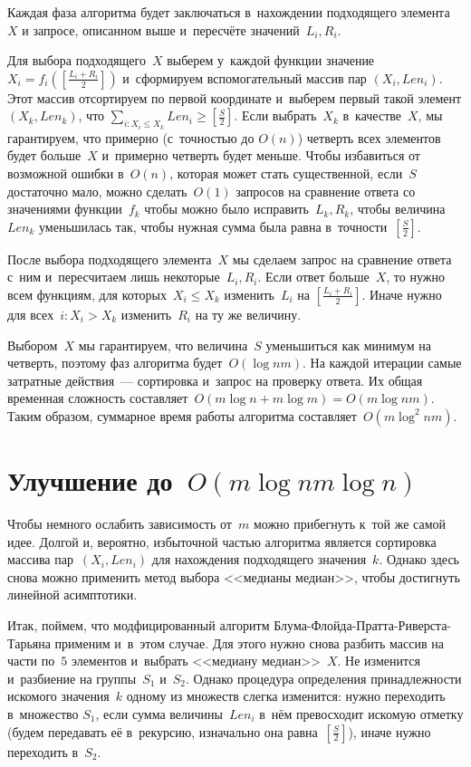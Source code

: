 \documentclass{article}
\renewcommand{\le}{\leqslant}
\renewcommand{\ge}{\geqslant}
\begin{document}
Каждая фаза алгоритма будет заключаться в~нахождении подходящего элемента $X$ и
запросе, описанном выше и~пересчёте значений~$L_i, R_i$.

Для выбора подходящего~$X$ выберем у~каждой функции значение~$X_i =
f_i(\left[\frac{L_i + R_i}{2}\right])$ и~сформируем вспомогательный массив пар
$(X_i, Len_i)$. Этот массив отсортируем по первой координате и~выберем первый
такой элемент $(X_k, Len_k)$, что $\sum\limits_{i: X_i \le X_k} Len_i \ge
\left[\frac{S}{2}\right]$. Если выбрать~$X_k$ в~качестве~$X$, мы гарантируем,
что примерно (с~точностью до $O(n)$) четверть всех элементов будет больше~$X$
и~примерно четверть будет меньше. Чтобы избавиться от возможной ошибки в~$O(n)$,
которая может стать существенной, если~$S$ достаточно мало, можно сделать~$O(1)$
запросов на сравнение ответа со значениями функции~$f_k$ чтобы можно было
исправить~$L_k, R_k$, чтобы величина~$Len_k$ уменьшилась так, чтобы нужная
сумма была равна в~точности~$\left[\frac{S}{2}\right]$.

После выбора подходящего элемента~$X$ мы сделаем запрос на сравнение ответа
с~ним и~пересчитаем лишь некоторые~$L_i, R_i$. Если ответ больше~$X$, то
нужно всем функциям, для которых~$X_i \le X_k$ изменить~$L_i$ на $\left[
\frac{L_i + R_i}{2} \right]$. Иначе нужно для всех~$i: X_i > X_k$ изменить~$R_i$
на ту же величину.

Выбором~$X$ мы гарантируем, что величина~$S$ уменьшиться как минимум на
четверть, поэтому фаз алгоритма будет~$O(\log nm)$. На каждой итерации самые
затратные действия~--- сортировка и~запрос на проверку ответа. Их общая
временная сложность составляет~$O(m \log n + m \log m) = O(m \log nm)$. Таким
образом, суммарное время работы алгоритма составляет~$O(m \log^2 nm)$.

\section{Улучшение до~$O(m \log nm \log n)$}

Чтобы немного ослабить зависимость от~$m$ можно прибегнуть к~той же самой идее.
Долгой и, вероятно, избыточной частью алгоритма является сортировка массива
пар~$(X_i, Len_i)$ для нахождения подходящего значения~$k$. Однако здесь снова
можно применить метод выбора <<медианы медиан>>, чтобы достигнуть линейной
асимптотики.

Итак, поймем, что модфицированный алгоритм Блума-Флойда-Пратта-Риверста-Тарьяна
применим и~в~этом случае. Для этого нужно снова разбить массив на части по~$5$
элементов и~выбрать <<медиану медиан>>~$X$. Не изменится и~разбиение на
группы~$S_1$ и~$S_2$. Однако процедура определения принадлежности искомого
значения~$k$ одному из множеств слегка изменится: нужно переходить в~множество
$S_1$, если сумма величины~$Len_i$ в~нём превосходит искомую отметку (будем
передавать её в~рекурсию, изначально она равна~$\left[\frac{S}{2}\right]$),
иначе нужно переходить в~$S_2$.
\end{document}
